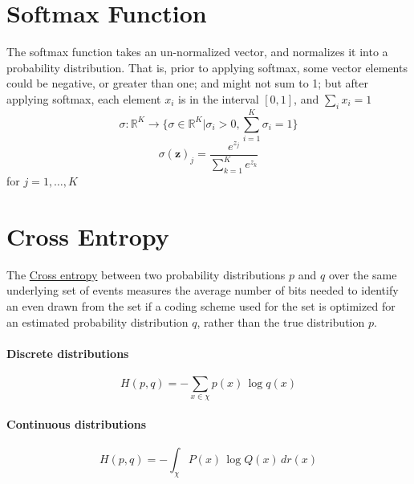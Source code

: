 \documentclass[11pt]{article}
\newcommand{\tb}[1]{\textbf{#1}}
\newcommand{\under}[1]{\underline{#1}}
\newcommand{\real}[0]{\mathbb{R}}
\newcommand{\vz}[0]{\tb{z}}
\begin{document}
	\section{Softmax Function}
	The softmax function takes an un-normalized vector, and normalizes it into a probability distribution. That is, prior to applying softmax, some vector elements could be negative, or greater than one; and might not sum to 1; but after applying softmax, each element $x_i$ is in the interval $[0,1]$, and $\sum_i x_i = 1$ \\
	$$\sigma:\real^K \rightarrow \{\sigma\in \real^K|\sigma_i>0,\sum_{i=1}^K \sigma_i = 1\}$$
	$$\sigma(\vz)_j = \frac{e^{z_j}}{\sum_{k=1}^K e^{z_k}}$$ for $j = 1,\hdots,K$
	
	\section{Cross Entropy}
	The \under{Cross entropy} between two probability distributions $p$ and $q$ over the same underlying set of events measures the average number of bits needed to identify an even drawn from the set if a coding scheme used for the set is optimized for an estimated probability distribution $q$, rather than the true distribution $p$.
	\paragraph{Discrete distributions}
	$$ H(p, q) = - \sum_{x \in \chi} p(x) \, \log q(x) $$
	\paragraph{Continuous distributions}
	$$ H(p, q) = - \int_\chi P(x)\, \log Q(x) \, dr(x) $$
\end{document}
